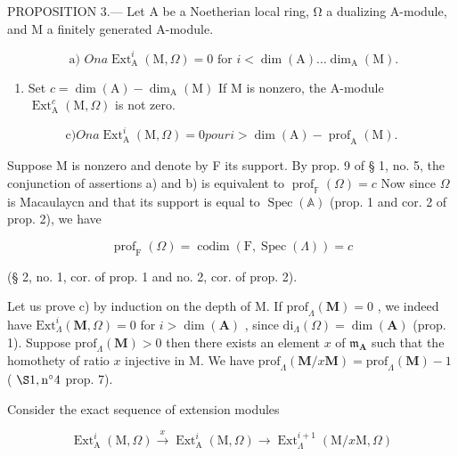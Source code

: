 PROPOSITION 3.--- Let A be a Noetherian local ring, Ω a dualizing A-module, and M a finitely generated A-module.

\[
\text { a) } O n a \operatorname{Ext} _ {\mathrm{A}} ^ {i} (\mathrm{M}, \Omega) = 0 \text { for } i <   \dim (\mathrm{A}) \dots \dim_ {\mathrm{A}} (\mathrm{M}).
\]

\begin{enumerate}
\def\labelenumi{\alph{enumi})}
\setcounter{enumi}{1}
\tightlist
\item
  Set \(c = \dim(\mathrm{A}) - \dim_{\mathrm{A}}(\mathrm{M})\) If M is nonzero, the A-module \(\operatorname{Ext}_{\mathrm{A}}^{c}(\mathrm{M}, \Omega)\) is not zero.
\end{enumerate}

\[
\mathrm{c)} O n a \operatorname{Ext} _ {\mathrm{A}} ^ {i} (\mathrm{M}, \Omega) = 0 p o u r i > \dim (\mathrm{A}) - \operatorname{prof} _ {\mathrm{A}} (\mathrm{M}).
\]

Suppose M is nonzero and denote by F its support. By prop. 9 of § 1, no. 5, the conjunction of assertions a) and b) is equivalent to \(\operatorname{prof}_{\mathbb{F}}(\Omega)=c\) Now since \(\Omega\) is Macaulaycn and that its support is equal to \(\operatorname{Spec}(\mathbb{A})\) (prop. 1 and cor. 2 of prop. 2), we have

\[
\operatorname{prof} _ {\mathrm{F}} (\Omega) = \operatorname{codim} (\mathrm{F}, \operatorname{Spec} (\Lambda)) = c
\]

(§ 2, no. 1, cor. of prop. 1 and no. 2, cor. of prop. 2).

Let us prove c) by induction on the depth of M. If \(\mathrm{prof}_{\Lambda}(\mathbf{M}) = 0\) , we indeed have \(\mathrm{Ext}_{\Lambda}^{i}(\mathbf{M},\Omega) = 0\) for \(i > \dim (\mathbf{A})\) , since \(\mathrm{di}_{\Lambda}(\Omega) = \dim (\mathbf{A})\) (prop. 1). Suppose \(\mathrm{prof}_{\Lambda}(\mathbf{M}) > 0\) then there exists an element \(x\) of \(\mathfrak{m}_{\mathbf{A}}\) such that the homothety of ratio \(x\) injective in M. We have \(\mathrm{prof}_{\Lambda}(\mathbf{M} / x\mathbf{M}) = \mathrm{prof}_{\Lambda}(\mathbf{M}) - 1\) ( \(\S 1, \mathrm{n}^{\circ}4\) prop. 7).

Consider the exact sequence of extension modules

\[
\operatorname{Ext} _ {\mathrm{A}} ^ {i} (\mathrm{M}, \Omega) \xrightarrow {x} \operatorname{Ext} _ {\mathrm{A}} ^ {i} (\mathrm{M}, \Omega) \longrightarrow \operatorname{Ext} _ {\Lambda} ^ {i + 1} (\mathrm{M} / x \mathrm{M}, \Omega)
\]

